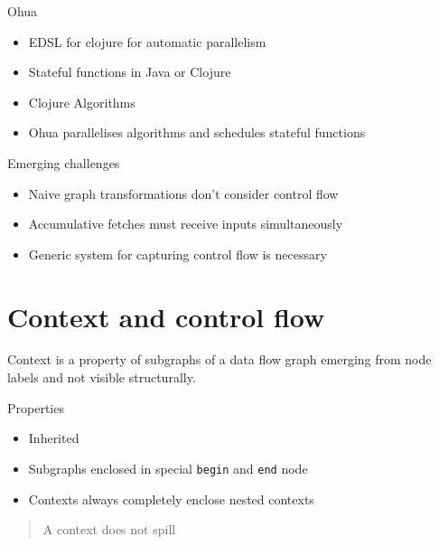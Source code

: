 \begin{frame}{Ohua}

\begin{itemize}[<+->]
\tightlist
\item
  EDSL for clojure for automatic parallelism
\item
  Stateful functions in Java or Clojure
\item
  Clojure Algorithms
\item
  Ohua parallelises algorithms and schedules stateful functions
\end{itemize}


\end{frame}

\begin{frame}{Emerging challenges}

\begin{itemize}[<+->]
\tightlist
\item
  Naive graph transformations don't consider control flow
\item
  Accumulative fetches must receive inputs simultaneously
\item
  Generic system for capturing control flow is necessary
\end{itemize}

\end{frame}

\section{Context and control flow}\label{context-and-control-flow}

\begin{frame}

Context is a property of subgraphs of a data flow graph emerging from
node labels and not visible structurally.

\end{frame}

\begin{frame}[fragile]{Properties}

\begin{itemize}[<+->]
\tightlist
\item
  Inherited
\item
  Subgraphs enclosed in special \texttt{begin} and \texttt{end} node
\item
  Contexts always completely enclose nested contexts
\end{itemize}

\pause

\begin{quote}
A context does not spill
\end{quote}

\end{frame}

